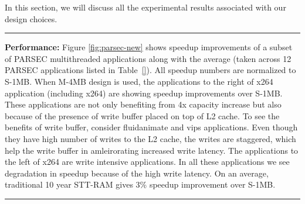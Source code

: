 In this section, we will discuss all the experimental results associated with our design choices.



\begin{figure*} [t]
\centering
 \hrule
 \caption{\label{fig:parsec-new} \scriptsize \bf Normalized speedup for PARSEC Applications }
\end{figure*}



\noindent\textbf {Performance:} Figure \ref{fig:parsec-new} shows speedup improvements of a subset of PARSEC 
multithreaded applications along with the average (taken across 12 PARSEC applications listed in Table~\ref{}). 
All speedup numbers are normalized to S-1MB. When M-4MB design is used, the applications to the right of x264 application (including x264) are
showing speedup improvements over S-1MB. These applications are not only benefiting from 4x capacity increase but also 
because of the presence of write buffer placed on top of L2 cache. To see the benefits of write buffer,  consider fluidanimate and vips applications.
Even though they have high number of writes to the L2 cache, the writes are staggered, which help the write buffer in amleirorating increased write latency.
The applications to the left of x264 are write intensive applications. In all these applications we see degradation in speedup
because of the high write latency.  On an average, traditional 10 year STT-RAM gives 3\% speedup improvement over S-1MB.



\begin{figure*} [t]
\centering
 \hrule
 \caption{\label{fig:spec-new} \scriptsize \bf Normalized Average Instruction Throughput(IT) and Weighted Speedup(WS) for SPEC 2006 multiprogrammed mixes. }
\end{figure*}



